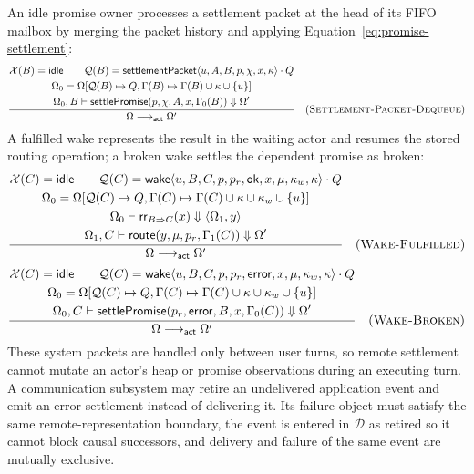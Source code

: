 An idle promise owner processes a settlement packet at the head of its FIFO
mailbox by merging the packet history and applying
Equation~\eqref{eq:promise-settlement}:
{\small\[
\dfrac{\begin{gathered}
 \mathcal X(B)=\mathsf{idle}\qquad
 \mathcal Q(B)=\mathsf{settlementPacket}\langle
    u,A,B,p,\chi,x,\kappa\rangle\cdot Q\\
 \Omega_0=\Omega[\mathcal Q(B)\mapsto Q,
                  \Gamma(B)\mapsto\Gamma(B)\cup\kappa\cup\{u\}]\\
 \Omega_0,B\vdash\mathsf{settlePromise}(p,\chi,A,x,\Gamma_0(B))
    \Downarrow\Omega'
\end{gathered}}
 {\Omega\longrightarrow_{\mathsf{act}}\Omega'}
\quad(\textsc{Settlement-Packet-Dequeue})
\]}
A fulfilled wake represents the result in the waiting actor and resumes the
stored routing operation; a broken wake settles the dependent promise as
broken:
{\small\[
\dfrac{\begin{gathered}
 \mathcal X(C)=\mathsf{idle}\qquad
 \mathcal Q(C)=\mathsf{wake}\langle
  u,B,C,p,p_r,\mathsf{ok},x,\mu,\kappa_w,\kappa\rangle\cdot Q\\
 \Omega_0=\Omega[\mathcal Q(C)\mapsto Q,
   \Gamma(C)\mapsto\Gamma(C)\cup\kappa\cup\kappa_w\cup\{u\}]\\
 \Omega_0\vdash\mathsf{rr}_{B\Rightarrow C}(x)
    \Downarrow\langle\Omega_1,y\rangle\\
 \Omega_1,C\vdash\mathsf{route}(y,\mu,p_r,\Gamma_1(C))
    \Downarrow\Omega'
\end{gathered}}
 {\Omega\longrightarrow_{\mathsf{act}}\Omega'}
\quad(\textsc{Wake-Fulfilled})
\]}
{\small\[
\dfrac{\begin{gathered}
 \mathcal X(C)=\mathsf{idle}\qquad
 \mathcal Q(C)=\mathsf{wake}\langle
  u,B,C,p,p_r,\mathsf{error},x,\mu,\kappa_w,\kappa\rangle\cdot Q\\
 \Omega_0=\Omega[\mathcal Q(C)\mapsto Q,
   \Gamma(C)\mapsto\Gamma(C)\cup\kappa\cup\kappa_w\cup\{u\}]\\
 \Omega_0,C\vdash\mathsf{settlePromise}(p_r,\mathsf{error},B,x,\Gamma_0(C))
    \Downarrow\Omega'
\end{gathered}}
 {\Omega\longrightarrow_{\mathsf{act}}\Omega'}
\quad(\textsc{Wake-Broken})
\]}
These system packets are handled only between user turns, so remote settlement
cannot mutate an actor's heap or promise observations during an executing turn.
A communication subsystem may retire an undelivered application event and
emit an error settlement instead of delivering it.  Its failure object must
satisfy the same remote-representation boundary, the event is entered in
$\mathcal D$ as retired so it cannot block causal successors, and delivery and
failure of the same event are mutually exclusive.


